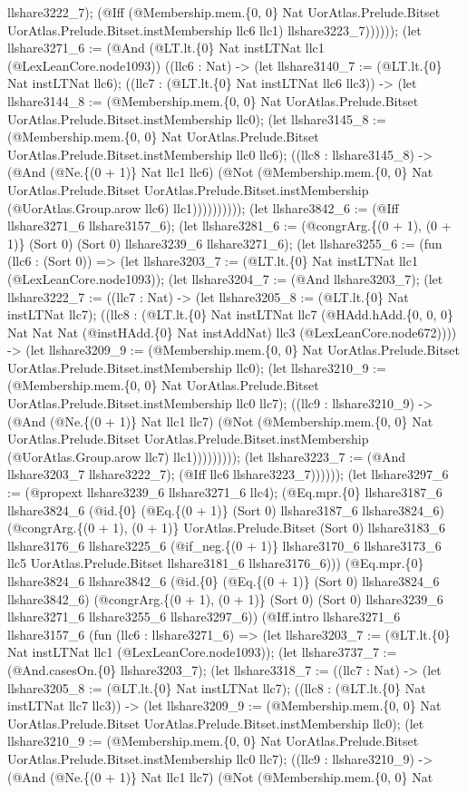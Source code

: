 \documentclass[11pt]{article}
\begin{document}
llshare3222\_7); (@Iff (@Membership.mem.\{0, 0\} Nat UorAtlas.Prelude.Bitset UorAtlas.Prelude.Bitset.instMembership llc6 llc1) llshare3223\_7)))))); (let llshare3271\_6 := (@And (@LT.lt.\{0\} Nat instLTNat llc1 (@LexLeanCore.node1093)) ((llc6 : Nat) -> (let llshare3140\_7 := (@LT.lt.\{0\} Nat instLTNat llc6); ((llc7 : (@LT.lt.\{0\} Nat instLTNat llc6 llc3)) -> (let llshare3144\_8 := (@Membership.mem.\{0, 0\} Nat UorAtlas.Prelude.Bitset UorAtlas.Prelude.Bitset.instMembership llc0); (let llshare3145\_8 := (@Membership.mem.\{0, 0\} Nat UorAtlas.Prelude.Bitset UorAtlas.Prelude.Bitset.instMembership llc0 llc6); ((llc8 : llshare3145\_8) -> (@And (@Ne.\{(0 + 1)\} Nat llc1 llc6) (@Not (@Membership.mem.\{0, 0\} Nat UorAtlas.Prelude.Bitset UorAtlas.Prelude.Bitset.instMembership (@UorAtlas.Group.arow llc6) llc1)))))))))); (let llshare3842\_6 := (@Iff llshare3271\_6 llshare3157\_6); (let llshare3281\_6 := (@congrArg.\{(0 + 1), (0 + 1)\} (Sort 0) (Sort 0) llshare3239\_6 llshare3271\_6); (let llshare3255\_6 := (fun (llc6 : (Sort 0)) => (let llshare3203\_7 := (@LT.lt.\{0\} Nat instLTNat llc1 (@LexLeanCore.node1093)); (let llshare3204\_7 := (@And llshare3203\_7); (let llshare3222\_7 := ((llc7 : Nat) -> (let llshare3205\_8 := (@LT.lt.\{0\} Nat instLTNat llc7); ((llc8 : (@LT.lt.\{0\} Nat instLTNat llc7 (@HAdd.hAdd.\{0, 0, 0\} Nat Nat Nat (@instHAdd.\{0\} Nat instAddNat) llc3 (@LexLeanCore.node672)))) -> (let llshare3209\_9 := (@Membership.mem.\{0, 0\} Nat UorAtlas.Prelude.Bitset UorAtlas.Prelude.Bitset.instMembership llc0); (let llshare3210\_9 := (@Membership.mem.\{0, 0\} Nat UorAtlas.Prelude.Bitset UorAtlas.Prelude.Bitset.instMembership llc0 llc7); ((llc9 : llshare3210\_9) -> (@And (@Ne.\{(0 + 1)\} Nat llc1 llc7) (@Not (@Membership.mem.\{0, 0\} Nat UorAtlas.Prelude.Bitset UorAtlas.Prelude.Bitset.instMembership (@UorAtlas.Group.arow llc7) llc1))))))))); (let llshare3223\_7 := (@And llshare3203\_7 llshare3222\_7); (@Iff llc6 llshare3223\_7)))))); (let llshare3297\_6 := (@propext llshare3239\_6 llshare3271\_6 llc4); (@Eq.mpr.\{0\} llshare3187\_6 llshare3824\_6 (@id.\{0\} (@Eq.\{(0 + 1)\} (Sort 0) llshare3187\_6 llshare3824\_6) (@congrArg.\{(0 + 1), (0 + 1)\} UorAtlas.Prelude.Bitset (Sort 0) llshare3183\_6 llshare3176\_6 llshare3225\_6 (@if\_neg.\{(0 + 1)\} llshare3170\_6 llshare3173\_6 llc5 UorAtlas.Prelude.Bitset llshare3181\_6 llshare3176\_6))) (@Eq.mpr.\{0\} llshare3824\_6 llshare3842\_6 (@id.\{0\} (@Eq.\{(0 + 1)\} (Sort 0) llshare3824\_6 llshare3842\_6) (@congrArg.\{(0 + 1), (0 + 1)\} (Sort 0) (Sort 0) llshare3239\_6 llshare3271\_6 llshare3255\_6 llshare3297\_6)) (@Iff.intro llshare3271\_6 llshare3157\_6 (fun (llc6 : llshare3271\_6) => (let llshare3203\_7 := (@LT.lt.\{0\} Nat instLTNat llc1 (@LexLeanCore.node1093)); (let llshare3737\_7 := (@And.casesOn.\{0\} llshare3203\_7); (let llshare3318\_7 := ((llc7 : Nat) -> (let llshare3205\_8 := (@LT.lt.\{0\} Nat instLTNat llc7); ((llc8 : (@LT.lt.\{0\} Nat instLTNat llc7 llc3)) -> (let llshare3209\_9 := (@Membership.mem.\{0, 0\} Nat UorAtlas.Prelude.Bitset UorAtlas.Prelude.Bitset.instMembership llc0); (let llshare3210\_9 := (@Membership.mem.\{0, 0\} Nat UorAtlas.Prelude.Bitset UorAtlas.Prelude.Bitset.instMembership llc0 llc7); ((llc9 : llshare3210\_9) -> (@And (@Ne.\{(0 + 1)\} Nat llc1 llc7) (@Not (@Membership.mem.\{0, 0\} Nat 
\end{document}
